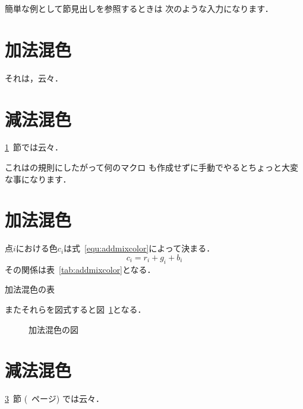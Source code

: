 簡単な例として節見出しを参照するときは
次のような入力になります．

\begin{InTeX}
\section{加法混色}\label{sec:addmix}
それは，云々． 
\section{減法混色}\label{sec:submix}
\ref{sec:addmix}~節では云々．
\end{InTeX}

これはの規則にしたがって何のマクロ
も作成せずに手動でやるとちょっと大変な事になります．

\begin{InTeX}
\section{加法混色}\label{sec:addmixcolor}
点$i$における色$c_i$は式~\ref{equ:addmixcolor}によって決まる．
\begin{equation}
 c_i  =  r_i + g_i + b_i\label{equ:addmixcolor}
\end{equation}
その関係は表~\ref{tab:addmixcolor}となる．
\begin{table}[htbp]
 \caption{加法混色の表}\label{tab:addmixcolor}
\end{table}
またそれらを図式すると図~\ref{fig:addmixcolor}となる．
\begin{figure}[htbp]
 \caption{加法混色の図}\label{fig:addmixcolor}
\end{figure}
\section{減法混色}\label{sec:submixcolor}
\ref{sec:addmixcolor}~節 (\pageref{sec:addmixcolor}~ページ) では云々．
\end{InTeX}


